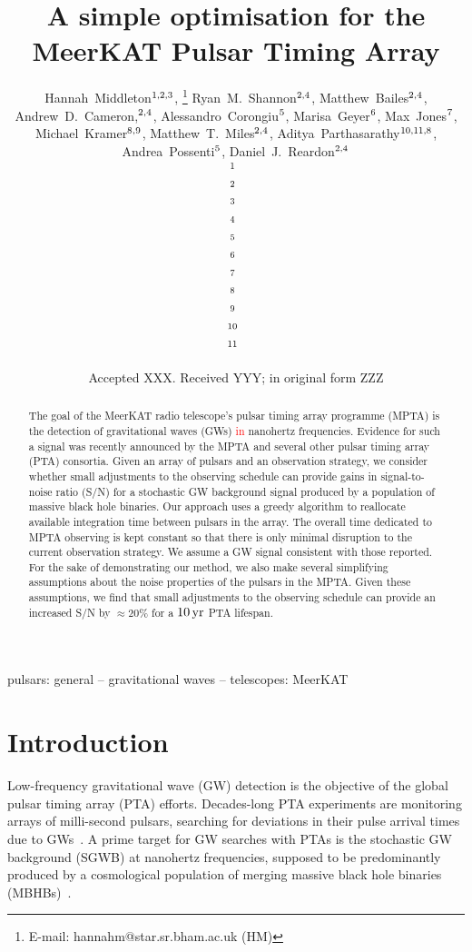 \documentclass[fleqn,usenatbib]{mnras}
\title[A simple optimisation for the MPTA]{A simple optimisation for the MeerKAT Pulsar Timing Array}
\author[H.~Middleton et al.]{Hannah~Middleton\orcidlink{0000-0001-5532-3622}$^{1,2,3}$, \thanks{E-mail: hannahm@star.sr.bham.ac.uk (HM)}
Ryan~M.~Shannon\orcidlink{0000-0002-7285-6348}$^{2,4}$, 
Matthew~Bailes\orcidlink{0000-0003-3294-3081}$^{2,4}$, 
Andrew~D.~Cameron\orcidlink{0000-0002-2037-4216},$^{2,4}$, 
\newauthor
Alessandro~Corongiu\orcidlink{0000-0002-5924-3141}$^{5}$, 
Marisa~Geyer\orcidlink{0000-0002-2822-1919}$^{6}$, 
Max~Jones\orcidlink{0009-0005-9124-1348}$^{7}$, 
Michael~Kramer\orcidlink{0000-0002-4175-2271}$^{8,9}$, 
Matthew~T.~Miles\orcidlink{0000-0002-5455-3474}$^{2,4}$, 
\newauthor
Aditya~Parthasarathy\orcidlink{0000-0002-4140-5616}$^{10,11,8}$, 
Andrea~Possenti\orcidlink{0000-0001-5902-3731}$^{5}$, 
Daniel~J.~Reardon\orcidlink{0000-0002-2035-4688}$^{2,4}$
\\
$^{1}$~\instBham\\
$^{2}$~\instSwin\\
$^{3}$~\instMelb\\
$^{4}$~\instOzGr\\
$^{5}$~\instINAF\\
$^{6}$~\instUoCT\\
$^{7}$~\instHull\\
$^{8}$~\instMaxP\\
$^{9}$~\instJodr\\
$^{10}$~\instAstr\\
$^{11}$~\instAmst\\
}
\date{Accepted XXX. Received YYY; in original form ZZZ}
\newcommand{\change}{\textcolor{red}}
\begin{document}
\label{firstpage}
\pagerange{\pageref{firstpage}--\pageref{lastpage}}

\maketitle

\begin{abstract}
The goal of the MeerKAT radio telescope's pulsar timing array programme (MPTA) is the detection of gravitational waves (GWs) \change{in} nanohertz frequencies.
Evidence for such a signal was recently announced by the MPTA and several other pulsar timing array (PTA) consortia.
Given an array of pulsars and an observation strategy, we consider whether small adjustments to the observing schedule can provide gains in signal-to-noise ratio (S/N) for a stochastic GW background signal produced by a population of massive black hole binaries. 
Our approach uses a greedy algorithm to reallocate available integration time between pulsars in the array. 
The overall time dedicated to MPTA observing is kept constant so that there is only minimal disruption to the current observation strategy.
We assume a GW signal consistent with those reported.
For the sake of demonstrating our method, we also make several simplifying assumptions about the noise properties of the pulsars in the MPTA.
Given these assumptions, we find that small adjustments to the observing schedule can provide an increased S/N by $\approx 20\%$ for a $10\,{\rm yr}$ PTA lifespan.
\end{abstract}

\begin{keywords}
pulsars: general -- gravitational waves -- telescopes: MeerKAT
\end{keywords}



\section{Introduction}
\label{sec:introduction}

Low-frequency gravitational wave (GW) detection is the objective of the global pulsar timing array (PTA) efforts. 
Decades-long PTA experiments are monitoring arrays of milli-second pulsars, searching for deviations in their pulse arrival times due to GWs~\citep{Sazhin:1978, Detweiler:1979, FosterBacker:1990}.
A prime target for GW searches with PTAs is the stochastic GW background (SGWB) at nanohertz frequencies, supposed to be predominantly produced by a cosmological population of merging massive black hole binaries (MBHBs)~\citep[see, for example,][]{BurkeSpolaorEtAl:2019,Sesana:2013, RajagopalRomani:1995}.
\end{document}
